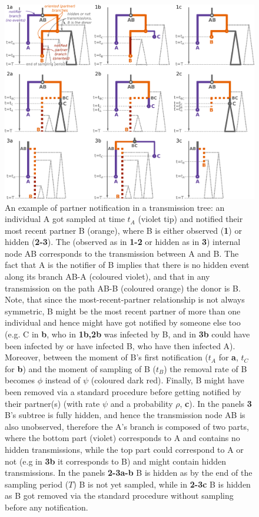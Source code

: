 \documentclass[a4paper,10pt]{article}
\begin{document}
\begin{figure}[tbhp]
\centering 
\includegraphics[width=1\textwidth]{Fig_PNbranches}
\caption{An example of partner notification in a transmission tree: an individual A got sampled at time $t_A$ (violet tip) and notified their most recent partner B (orange), where B is either observed (\textbf{1}) or hidden (\textbf{2-3}). 
The (observed as in \textbf{1-2} or hidden as in \textbf{3}) internal node AB corresponds to the transmission between A and B. The fact that A is the notifier of B implies that there is no hidden event along its branch AB-A (coloured violet), and that in any transmission on the path AB-B (coloured orange) the donor is B. Note, that since the most-recent-partner relationship is not always symmetric, B might be the most recent partner of more than one individual and hence might have got notified by someone else too (e.g. C in \textbf{b}, who in \textbf{1b,2b} was infected by B, and in \textbf{3b} could have been infected by or have infected B, who have then infected A). Moreover, between the moment of B's first notification ($t_A$ for \textbf{a}, $t_C$ for \textbf{b}) and the moment of sampling  of B ($t_B$) the removal rate of B becomes $\phi$ instead of $\psi$ (coloured dark red). Finally, B might have been removed via a standard procedure before getting notified by their partner(s) (with rate $\psi$ and a probability $\rho$, \textbf{c}).
In the panels \textbf{3} B's subtree is fully hidden, and hence the transmission node AB is also unobserved, therefore the A's branch is composed of two parts, where the bottom part (violet) corresponds to A and contains no hidden transmissions, while the top part could correspond to A or not  (e.g in \textbf{3b} it corresponds to B) and might contain hidden transmissions. 
In the panels \textbf{2-3a-b} B is hidden as by the end of the sampling period ($T$) B is not yet sampled, while in \textbf{2-3c} B is hidden as B got removed via the standard procedure without sampling before any notification.}
\label{fig:pn-branches} 
\end{figure}
\end{document}
